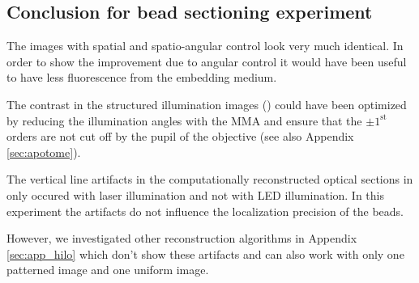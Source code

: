 \subsection{Conclusion for bead sectioning experiment}
The images with spatial  and spatio-angular control
 look very much identical. In order to show the
improvement due to angular control it would have been useful to have
less fluorescence from the embedding medium.

The contrast in the structured illumination images
() could have been optimized by reducing the
illumination angles with the MMA and ensure that the $\pm
1^\textrm{st}$ orders are not cut off by the pupil of the objective
(see also Appendix \ref{sec:apotome}).

The vertical line artifacts in the computationally reconstructed
optical sections in  only occured with laser
illumination and not with LED illumination. In this experiment the
artifacts do not influence the localization precision of the beads.

However, we investigated other reconstruction algorithms in Appendix
\ref{sec:app_hilo} which don't show these artifacts and can also work
with only one patterned image and one uniform image.
